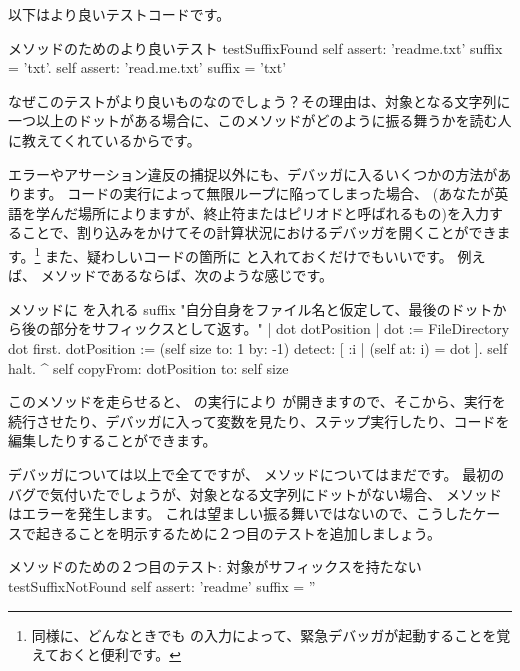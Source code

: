 \documentclass[a4paper,10pt,twoside]{book}
\begin{document}
以下はより良いテストコードです。

\begin{method}[testSuffix2]{ メソッドのためのより良いテスト}
testSuffixFound
self assert: 'readme.txt' suffix = 'txt'.
self assert: 'read.me.txt' suffix = 'txt'
\end{method}
\noindent
なぜこのテストがより良いものなのでしょう？その理由は、対象となる文字列に一つ以上のドットがある場合に、このメソッドがどのように振る舞うかを読む人に教えてくれているからです。

エラーやアサーション違反の捕捉以外にも、デバッガに入るいくつかの方法があります。
コードの実行によって無限ループに陥ってしまった場合、  (あなたが英語を学んだ場所によりますが、終止符またはピリオドと呼ばれるもの)を入力することで、割り込みをかけてその計算状況におけるデバッガを開くことができます。\footnote{同様に、どんなときでも  の入力によって、緊急デバッガが起動することを覚えておくと便利です。}
また、疑わしいコードの箇所に  と入れておくだけでもいいです。
例えば、 メソッドであるならば、次のような感じです。

\needspace{11ex}
\begin{method}[suffix]{ メソッドに  を入れる}
suffix
"自分自身をファイル名と仮定して、最後のドットから後の部分をサフィックスとして返す。"
| dot dotPosition |
dot := FileDirectory dot first.
dotPosition := (self size to: 1 by: -1) detect: [ :i | (self at: i) = dot ].
self halt.
^ self copyFrom: dotPosition to: self size
\end{method}

このメソッドを走らせると、  の実行により  が開きますので、そこから、実行を続行させたり、デバッガに入って変数を見たり、ステップ実行したり、コードを編集したりすることができます。

デバッガについては以上で全てですが、  メソッドについてはまだです。
最初のバグで気付いたでしょうが、対象となる文字列にドットがない場合、 メソッドはエラーを発生します。
これは望ましい振る舞いではないので、こうしたケースで起きることを明示するために２つ目のテストを追加しましょう。

\begin{method}[testNoSuffix]{ メソッドのための２つ目のテスト: 対象がサフィックスを持たない}
testSuffixNotFound
self assert: 'readme' suffix = ''
\end{method}

\end{document}
